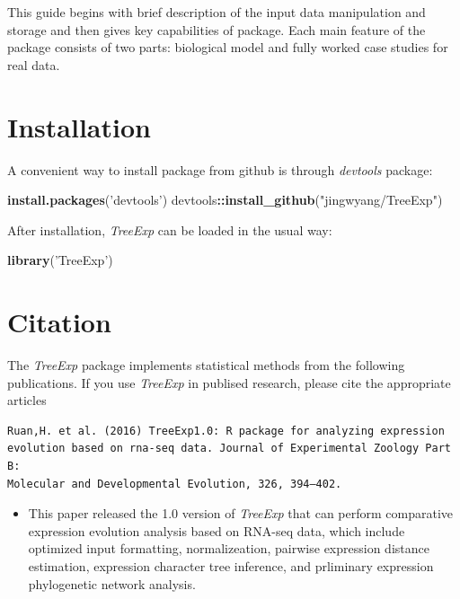 \documentclass[]{book}
\newenvironment{Shaded}{\begin{snugshade}}{\end{snugshade}}
\newcommand{\KeywordTok}[1]{\textcolor[rgb]{0.13,0.29,0.53}{\textbf{#1}}}
\newcommand{\NormalTok}[1]{#1}
\newcommand{\OperatorTok}[1]{\textcolor[rgb]{0.81,0.36,0.00}{\textbf{#1}}}
\newcommand{\StringTok}[1]{\textcolor[rgb]{0.31,0.60,0.02}{#1}}
\providecommand{\tightlist}{%
  \setlength{\itemsep}{0pt}\setlength{\parskip}{0pt}}
\begin{document}
This guide begins with brief description of the input data manipulation and storage and then gives key capabilities of package. Each main feature of the package consists of two parts: biological model and fully worked case studies for real data.

\newpage

\hypertarget{installation}{%
\section{Installation}\label{installation}}

A convenient way to install package from github is through \emph{devtools} package:

\begin{Shaded}
\begin{Highlighting}[]
\KeywordTok{install.packages}\NormalTok{(}\StringTok{'devtools'}\NormalTok{)}
\NormalTok{devtools}\OperatorTok{::}\KeywordTok{install_github}\NormalTok{(}\StringTok{"jingwyang/TreeExp"}\NormalTok{)}
\end{Highlighting}
\end{Shaded}

After installation, \emph{TreeExp} can be loaded in the usual way:

\begin{Shaded}
\begin{Highlighting}[]
\KeywordTok{library}\NormalTok{(}\StringTok{'TreeExp'}\NormalTok{)}
\end{Highlighting}
\end{Shaded}

\newpage

\hypertarget{citation}{%
\section{Citation}\label{citation}}

The \emph{TreeExp} package implements statistical methods from the following publications. If you use \emph{TreeExp} in publised research, please cite the appropriate articles

\begin{verbatim}
Ruan,H. et al. (2016) TreeExp1.0: R package for analyzing expression 
evolution based on rna-seq data. Journal of Experimental Zoology Part B: 
Molecular and Developmental Evolution, 326, 394–402.
\end{verbatim}

\begin{itemize}
\tightlist
\item
  This paper \citep{doi:10.1002/jez.b.22707} released the 1.0 version of \emph{TreeExp} that can perform comparative expression evolution analysis based on RNA-seq data, which include optimized input formatting, normalizeation, pairwise expression distance estimation, expression character tree inference, and prliminary expression phylogenetic network analysis.
\end{itemize}
\end{document}
